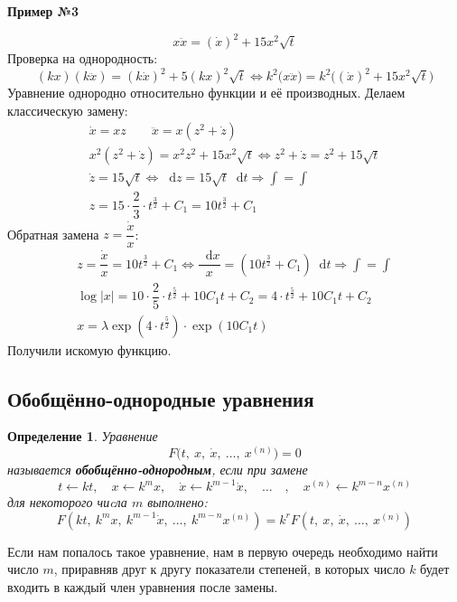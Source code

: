 \documentclass[a4paper,12pt]{article}
\newtheorem{definition}{Определение}
\renewcommand*\d{\mathop{}\!\mathrm{d}}
\newcommand{\dx}{\dot{x}}
\newcommand{\ddx}{\ddot{x}}
\newcommand{\dz}{\dot{z}}
\newcommand{\bto}{\Longrightarrow}
\newcommand{\ds}{\displaystyle}
\begin{document}
\textbf{Пример №3}

\[x\ddx = (\dx)^2 + 15x^2\sqrt{t}\]
Проверка на однородность:
\[(kx)(k\ddx) = (k\dx)^2 + 5(kx)^2 \sqrt{ t } \iff k^2\big(x\ddx\big) = k^2\Big((\dx)^2 + 15x^2\sqrt{t}\Big)\]
Уравнение однородно относительно функции и её производных. Делаем классическую замену:
\begin{gather*}
	\dx = xz \qquad \ddx = x\left(z^2 + \dz\right)\\
	x^2\left(z^2 + \dz\right) = x^2z^2 + 15x^2 \sqrt{t} \iff z^2 + \dz = z^2 + 15\sqrt{t}\\
	\dz = 15\sqrt{t} \iff \d z = 15\sqrt{t}\d t \bto \ds\int = \int\\
	z = 15\cdot \dfrac{2}{3}\cdot t^{\frac{3}{2}} + C_1 = 10t^{\frac{3}{2}} + C_1
\end{gather*}
Обратная замена $z = \dfrac{\dx}{x}$:
\begin{gather*}
	z = \dfrac{\dx}{x} = 10t^{\frac{3}{2}} + C_1 \iff \dfrac{\d x}{x} = \left(10t^{\frac{3}{2}} + C_1\right)\d t \bto \ds\int = \int\\
	\log|x| = 10 \cdot \dfrac{2}{5} \cdot t^{\frac{5}{2}} + 10C_1t + C_2 = 4\cdot t^{\frac{5}{2}} + 10C_1t + C_2\\
	x = \lambda \exp(4\cdot t^{\frac{5}{2}}) \cdot \exp(10C_1t)
\end{gather*}
Получили искомую функцию.

\subsection{Обобщённо-однородные уравнения}

\begin{definition}
	Уравнение 
	\[F\big(t,\ x,\ \dx,\ \ldots,\ x^{(n)}\big) = 0\]
	называется \textbf{обобщённо-однородным}, если при замене 
	\[t\leftarrow kt,\quad x \leftarrow k^mx,\quad \dx \leftarrow k^{m - 1}\dx,\quad \ldots \quad,\quad x^{(n)} \leftarrow k^{m - n}x^{(n)}\]
	для некоторого чиcла $m$ выполнено:
	\[F\left(kt,\ k^mx,\ k^{m - 1}\dx,\ \ldots,\ k^{m - n}x^{(n)}\right) = k^rF\left(t,\ x,\ \dx,\ \ldots,\ x^{(n)}\right)\]
\end{definition}
Если нам попалось такое уравнение, нам в первую очередь необходимо найти число $m$, приравняв друг к другу показатели степеней, в которых число $k$ будет входить в каждый член уравнения после замены.
\end{document}
